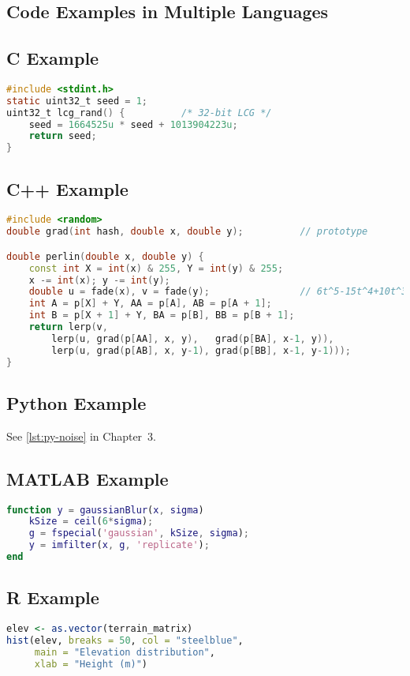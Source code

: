 \documentclass{report}
\begin{document}
\begin{umaappendices}
\section{Code Examples in Multiple Languages}

\subsection{C Example}
\begin{lstlisting}[language=C,caption={C: Linear Congruential RNG},label={lst:c-lcg}]
#include <stdint.h>
static uint32_t seed = 1;
uint32_t lcg_rand() {          /* 32-bit LCG */
    seed = 1664525u * seed + 1013904223u;
    return seed;
}
\end{lstlisting}

\subsection{C++ Example}
\begin{lstlisting}[language=C++,caption={C++17: Fast Perlin Noise},label={lst:cpp-perlin}]
#include <random>
double grad(int hash, double x, double y);          // prototype

double perlin(double x, double y) {
    const int X = int(x) & 255, Y = int(y) & 255;
    x -= int(x); y -= int(y);
    double u = fade(x), v = fade(y);                // 6t^5-15t^4+10t^3
    int A = p[X] + Y, AA = p[A], AB = p[A + 1];
    int B = p[X + 1] + Y, BA = p[B], BB = p[B + 1];
    return lerp(v,
        lerp(u, grad(p[AA], x, y),   grad(p[BA], x-1, y)),
        lerp(u, grad(p[AB], x, y-1), grad(p[BB], x-1, y-1)));
}
\end{lstlisting}

\subsection{Python Example}
See \cref{lst:py-noise} in Chapter~3.

\subsection{MATLAB Example}
\begin{lstlisting}[language=Matlab,caption={MATLAB: Gaussian Blur},label={lst:matlab-blur}]
function y = gaussianBlur(x, sigma)
    kSize = ceil(6*sigma);
    g = fspecial('gaussian', kSize, sigma);
    y = imfilter(x, g, 'replicate');
end
\end{lstlisting}

\subsection{R Example}
\begin{lstlisting}[language=R,caption={R: Elevation Histogram},label={lst:r-hist}]
elev <- as.vector(terrain_matrix)
hist(elev, breaks = 50, col = "steelblue",
     main = "Elevation distribution",
     xlab = "Height (m)")
\end{lstlisting}
\end{umaappendices}

\backmatter
\printbibliography
\cleardoublepage
\MakeUMABackCover
\end{document}
